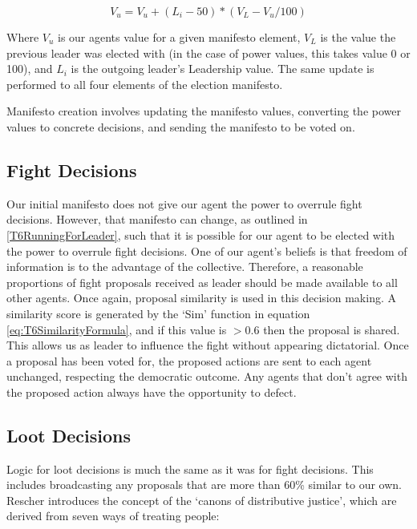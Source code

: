 \begin{equation}\label{eq:T6ManifestoFormula}
    V_{u} = V_{u} + (L_{i}-50)*(V_{L}-V_{u}/100)
\end{equation}

Where $V_{u}$ is our agents value for a given manifesto element, $V_{L}$ is the value the previous leader was elected with (in the case of power values, this takes value 0 or 100), and $L_{i}$ is the outgoing leader's Leadership value. The same update is performed to all four elements of the election manifesto.

Manifesto creation involves updating the manifesto values, converting the power values to concrete decisions, and sending the manifesto to be voted on.

\subsection{Fight Decisions}

Our initial manifesto does not give our agent the power to overrule fight decisions. However, that manifesto can change, as outlined in \ref{T6RunningForLeader}, such that it is possible for our agent to be elected with the power to overrule fight decisions. One of our agent's beliefs is that freedom of information is to the advantage of the collective. Therefore, a reasonable proportions of fight proposals received as leader should be made available to all other agents. Once again, proposal similarity is used in this decision making. A similarity score is generated by the `Sim' function in equation \ref{eq:T6SimilarityFormula}, and if this value is $>0.6$ then the proposal is shared. This allows us as leader to influence the fight without appearing dictatorial. Once a proposal has been voted for, the proposed actions are sent to each agent unchanged, respecting the democratic outcome. Any agents that don't agree with the proposed action always have the opportunity to defect.

\subsection{Loot Decisions}

Logic for loot decisions is much the same as it was for fight decisions. This includes broadcasting any proposals that are more than 60\% similar to our own. Rescher \cite{rescher1966} introduces the concept of the `canons of distributive justice', which are derived from seven ways of treating people:


